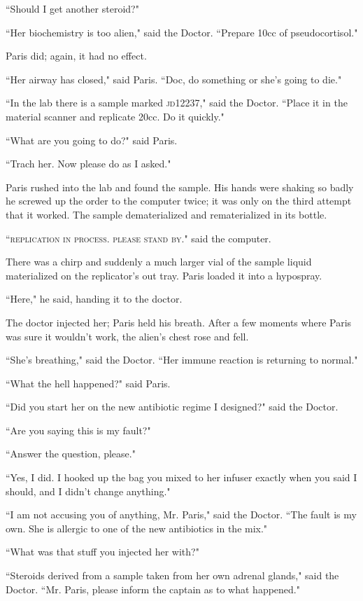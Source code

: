 \documentclass[twoside,letterpaper,12pt]{memoir}
\begin{document}
``Should I get another steroid?" 

``Her biochemistry is too alien," said the Doctor. ``Prepare 10cc of pseudocortisol." 

Paris did; again, it had no effect. 

``Her airway has closed," said Paris. ``Doc, do something or she's going to die." 

``In the lab there is a sample marked \textsc{jd12237}," said the Doctor. ``Place it in the material scanner and replicate 20cc. Do it quickly." 

``What are you going to do?" said Paris. 

``Trach her. Now please do as I asked." 

Paris rushed into the lab and found the sample. His hands were shaking so badly he screwed up the order to the computer twice; it was only on the third attempt that it worked. The sample dematerialized and rematerialized in its bottle. 

``\textsc{replication in process. please stand by}." said the computer. 

There was a chirp and suddenly a much larger vial of the sample liquid materialized on the replicator's out tray. Paris loaded it into a hypospray. 

``Here," he said, handing it to the doctor. 

The doctor injected her; Paris held his breath. After a few moments where Paris was sure it wouldn't work, the alien's chest rose and fell. 

``She's breathing," said the Doctor. ``Her immune reaction is returning to normal." 

``What the hell happened?" said Paris. 

``Did you start her on the new antibiotic regime I designed?" said the Doctor. 

``Are you saying this is my fault?" 

``Answer the question, please." 

``Yes, I did. I hooked up the bag you mixed to her infuser exactly when you said I should, and I didn't change anything." 

``I am not accusing you of anything, Mr. Paris," said the Doctor. ``The fault is my own. She is allergic to one of the new antibiotics in the mix." 

``What was that stuff you injected her with?" 

``Steroids derived from a sample taken from her own adrenal glands," said the Doctor. ``Mr. Paris, please inform the captain as to what happened." 
\end{document}
